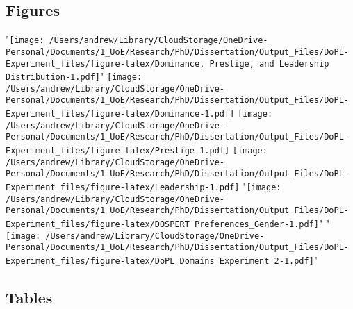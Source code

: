\documentclass[
"  donotrepeattitle,doc, 12pt, a4paper,floatsintext]{apa7}"
\begin{document}
\hypertarget{figures}{%
\subsection{Figures}\label{figures}}
"\texttt{[image: /Users/andrew/Library/CloudStorage/OneDrive-Personal/Documents/1\_UoE/Research/PhD/Dissertation/Output\_Files/DoPL-Experiment\_files/figure-latex/Dominance, Prestige, and Leadership Distribution-1.pdf]}"
\texttt{[image: /Users/andrew/Library/CloudStorage/OneDrive-Personal/Documents/1\_UoE/Research/PhD/Dissertation/Output\_Files/DoPL-Experiment\_files/figure-latex/Dominance-1.pdf]}
\texttt{[image: /Users/andrew/Library/CloudStorage/OneDrive-Personal/Documents/1\_UoE/Research/PhD/Dissertation/Output\_Files/DoPL-Experiment\_files/figure-latex/Prestige-1.pdf]}
\texttt{[image: /Users/andrew/Library/CloudStorage/OneDrive-Personal/Documents/1\_UoE/Research/PhD/Dissertation/Output\_Files/DoPL-Experiment\_files/figure-latex/Leadership-1.pdf]}
"\texttt{[image: /Users/andrew/Library/CloudStorage/OneDrive-Personal/Documents/1\_UoE/Research/PhD/Dissertation/Output\_Files/DoPL-Experiment\_files/figure-latex/DOSPERT Preferences\_Gender-1.pdf]}"
"\texttt{[image: /Users/andrew/Library/CloudStorage/OneDrive-Personal/Documents/1\_UoE/Research/PhD/Dissertation/Output\_Files/DoPL-Experiment\_files/figure-latex/DoPL Domains Experiment 2-1.pdf]}"
\newpage
\hypertarget{tables}{%
\subsection{Tables}\label{tables}}
\end{document}
